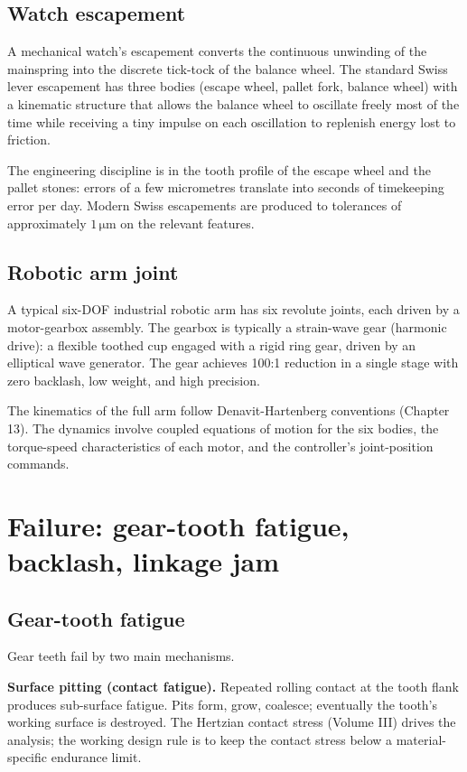 \subsection{Watch escapement}

A mechanical watch's escapement converts the continuous unwinding of the mainspring into the discrete tick-tock of the balance wheel. The standard Swiss lever escapement has three bodies (escape wheel, pallet fork, balance wheel) with a kinematic structure that allows the balance wheel to oscillate freely most of the time while receiving a tiny impulse on each oscillation to replenish energy lost to friction.

The engineering discipline is in the tooth profile of the escape wheel and the pallet stones: errors of a few micrometres translate into seconds of timekeeping error per day. Modern Swiss escapements are produced to tolerances of approximately $1\,\si{\micro\meter}$ on the relevant features.

\subsection{Robotic arm joint}

A typical six-DOF industrial robotic arm has six revolute joints, each driven by a motor-gearbox assembly. The gearbox is typically a strain-wave gear (harmonic drive): a flexible toothed cup engaged with a rigid ring gear, driven by an elliptical wave generator. The gear achieves 100:1 reduction in a single stage with zero backlash, low weight, and high precision.

The kinematics of the full arm follow Denavit-Hartenberg conventions (Chapter 13). The dynamics involve coupled equations of motion for the six bodies, the torque-speed characteristics of each motor, and the controller's joint-position commands.

\section{Failure: gear-tooth fatigue, backlash, linkage jam}

\subsection{Gear-tooth fatigue}

Gear teeth fail by two main mechanisms.

\textbf{Surface pitting (contact fatigue).} Repeated rolling contact at the tooth flank produces sub-surface fatigue. Pits form, grow, coalesce; eventually the tooth's working surface is destroyed. The Hertzian contact stress (Volume III) drives the analysis; the working design rule is to keep the contact stress below a material-specific endurance limit.

